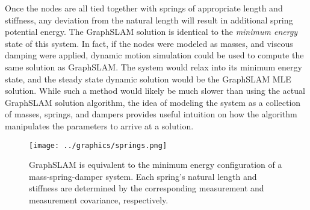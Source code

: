 Once the nodes are all tied together with springs of appropriate length and stiffness, any deviation from the natural length will result in additional spring potential energy. The GraphSLAM solution is identical to the \emph{minimum energy} state of this system. In fact, if the nodes were modeled as masses, and viscous damping were applied, dynamic motion simulation could be used to compute the same solution as GraphSLAM. The system would relax into its minimum energy state, and the steady state dynamic solution would be the GraphSLAM MLE solution. While such a method would likely be much slower than using the actual GraphSLAM solution algorithm, the idea of modeling the system as a collection of masses, springs, and dampers provides useful intuition on how the algorithm manipulates the parameters to arrive at a solution.

\begin{figure}[htb]
   \centering
   \texttt{[image: ../graphics/springs.png]} %
   \caption{GraphSLAM is equivalent to the minimum energy configuration of a mass-spring-damper system. Each spring's natural length and stiffness are determined by the corresponding measurement and measurement covariance, respectively.}
   \label{fig:springs}
\end{figure}






